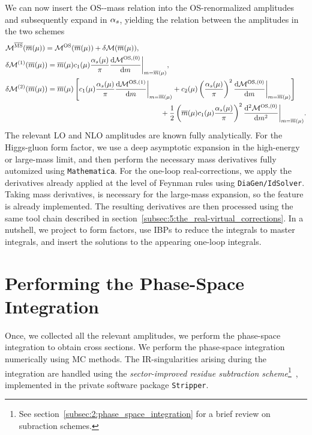 We can now insert the \acs{OS}-\MS-mass relation into the \acs{OS}-renormalized amplitudes and subsequently expand in $\alpha_s$, yielding the relation between the amplitudes in the two schemes
\begin{equation}
\begin{split}
  & \mathcal{M}^{\overline{\text{MS}}}(\overline{m}(\mu)) = \mathcal{M}^{\text{OS}}(\overline{m}(\mu)) + \delta \mathcal{M} (\overline{m}(\mu)), \\
  & \delta \mathcal{M}^{(1)} (\overline{m}(\mu)) = \overline{m}(\mu)c_1(\mu) \frac{\alpha_s(\mu)}{\pi}\frac{\mathrm{d} \mathcal{M}^{\text{OS},(0)}}{\mathrm{d} m} \bigg \vert_{m = \overline{m}(\mu)} , \\
  & \delta \mathcal{M}^{(2)} (\overline{m}(\mu)) = \overline{m}(\mu) \left[ c_1(\mu) \frac{\alpha_s(\mu)}{\pi} \frac{\mathrm{d} \mathcal{M}^{\text{OS},(1)}}{\mathrm{d} m}\bigg \vert_{m = \overline{m}(\mu)}  + c_2(\mu) \left(\frac{\alpha_s(\mu)}{\pi}\right)^2 \frac{\mathrm{d}\mathcal{M}^{\text{OS},(0)}}{\mathrm{d}m}\bigg \vert_{m = \overline{m}(\mu)}  \right] \\
  & \hspace{7.5cm}+ \frac{1}{2}\left(\overline{m}(\mu) c_1(\mu) \frac{\alpha_s(\mu)}{\pi} \right)^2 \frac{\mathrm{d}^2 \mathcal{M}^{\text{OS},(0)}}{\mathrm{d} m^2} \bigg \vert_{m = \overline{m}(\mu)} .
\end{split}
\label{eq:5:MMS_to_MOS}
\end{equation}
The relevant \acs{LO} and \acs{NLO} amplitudes are known fully analytically. For the Higgs-gluon form factor, we use a deep asymptotic expansion in the high-energy or large-mass limit,  and then perform the necessary mass derivatives fully automized using \texttt{Mathematica}. For the one-loop real-corrections, we apply the derivatives already applied at the level of Feynman rules using \texttt{DiaGen/IdSolver}. Taking mass derivatives, is necessary for the large-mass expansion, so the feature is already implemented. The resulting derivatives are then processed using the same tool chain described in section~\ref{subsec:5:the_real-virtual_corrections}. In a nutshell, we project to form factors, use \acs{IBP}s to reduce the integrals to master integrals, and insert the solutions to the appearing one-loop integrals.


\section{Performing the Phase-Space Integration}
Once, we collected all the relevant amplitudes, we perform the phase-space integration to obtain cross sections. We perform the phase-space integration numerically using \acs{MC} methods. The \acs{IR}-singularities arising during the integration are handled using the \textit{sector-improved residue subtraction scheme}\footnote{See section~\ref{subsec:2:phase_space_integration} for a brief review on subraction schemes.}~\cite{Czakon:2010td}, implemented in the private software package \texttt{Stripper}.

